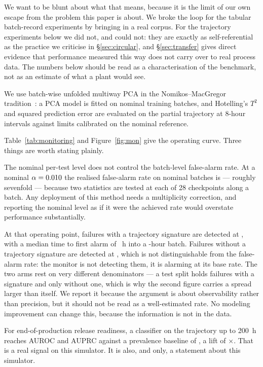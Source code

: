 \documentclass[11pt]{article}
\begin{document}
We want to be blunt about what that means, because it is the limit of our own
escape from the problem this paper is about. We broke the loop for the tabular
batch-record experiments by bringing in a real corpus. For the trajectory
experiments below we did not, and could not: they are exactly as
self-referential as the practice we criticise in \S\ref{sec:circular}, and
\S\ref{sec:transfer} gives direct evidence that performance measured this way
does not carry over to real process data. The numbers below should be read as a
characterisation of the benchmark, not as an estimate of what a plant would
see.

We use batch-wise unfolded multiway PCA in the Nomikos--MacGregor
tradition~\citep{nomikos1994monitoring,nomikos1995multivariate}: a PCA model is
fitted on nominal training batches, and Hotelling's $T^2$ and squared prediction
error are evaluated on the partial trajectory at 8-hour intervals against limits
calibrated on the nominal reference.

Table~\ref{tab:monitoring} and Figure~\ref{fig:mon} give the operating curve.
Three things are worth stating plainly.

The nominal per-test level does not control the batch-level false-alarm rate. At
a nominal $\alpha = 0.010{}$ the realised false-alarm rate on nominal batches
is \monFA{} --- roughly sevenfold --- because two statistics are tested at each
of 28 checkpoints along a batch. Any deployment of this method needs a
multiplicity correction, and reporting the nominal level as if it were the
achieved rate would overstate performance substantially.

At that operating point, failures with a trajectory signature are detected at
\monDetObs{}, with a median time to first alarm of \monTTD{}~h into a
\simDurationH{}-hour batch. Failures without a trajectory signature are detected
at \monDetUnobs{}, which is not distinguishable from the false-alarm rate: the
monitor is not detecting them, it is alarming at its base rate. The two arms rest
on very different denominators --- a test split holds \monNObsFail{} failures
with a signature and only \monNUnobsFail{} without one, which is why the second
figure carries a spread larger than itself. We report it because the argument is
about observability rather than precision, but it should not be read as a
well-estimated rate. No modeling
improvement can change this, because the information is not in the data.

For end-of-production release readiness, a classifier on the trajectory up to
200~h reaches AUROC \readyAUROC{} and AUPRC \readyAUPRC{} against a prevalence
baseline of \readyPrev{}, a lift of \readyLift{}$\times$. That is a real signal on
this simulator. It is also, and only, a statement about this simulator.
\end{document}
